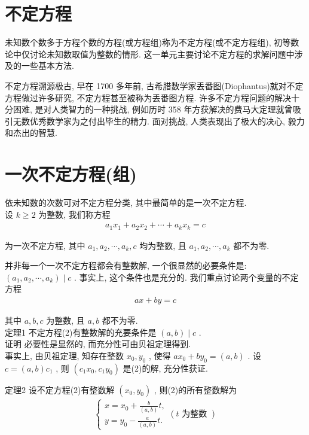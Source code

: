 	\section{不定方程}
	未知数个数多于方程个数的方程(或方程组)称为不定方程(或不定方程组), 初等数论中仅讨论未知数取值为整数的情形. 这一单元主要讨论不定方程的求解问题中涉及的一些基本方法.

	不定方程溯源极古, 早在 1700 多年前, 古希腊数学家丢番图(Diophantus)就对不定方程做过许多研究, 不定方程甚至被称为丢番图方程. 许多不定方程问题的解决十分困难, 是对人类智力的一种挑战, 例如历时 358 年方获解决的费马大定理就曾吸引无数优秀数学家为之付出毕生的精力. 面对挑战, 人类表现出了极大的决心, 毅力和杰出的智慧.

	\section{一次不定方程(组)}
	依未知数的次数可对不定方程分类, 其中最简单的是一次不定方程. \\
	设 $k \geqslant 2$ 为整数, 我们称方程
\begin{align*}
		a_{1} x_{1}+a_{2} x_{2}+\cdots+a_{k} x_{k}=c
	\end{align*}

	为一次不定方程, 其中 $a_{1} ,  a_{2} ,  \cdots ,  a_{k} ,  c$ 均为整数, 且 $a_{1} ,  a_{2} ,  \cdots ,  a_{k}$ 都不为零.

	并非每一个一次不定方程都会有整数解, 一个很显然的必要条件是:  $\left(a_{1}, a_{2}, \cdots, a_{k}\right) \mid c$ . 事实上, 这个条件也是充分的. 我们重点讨论两个变量的不定方程
\begin{align*}
		a x+b y=c
	\end{align*}

	其中 $a ,  b ,  c$ 为整数, 且 $a ,  b$ 都不为零. \\
	定理1 不定方程(2)有整数解的充要条件是 $(a, b) \mid c$ . \\
	证明 必要性是显然的, 而充分性可由贝祖定理得到. \\
	事实上, 由贝祖定理, 知存在整数 $x_{0} ,  y_{0}$ , 使得 $a x_{0}+b y_{0}=(a, b)$ . 设 $c=(a, b) c_{1}$ , 则 $\left(c_{1} x_{0}, c_{1} y_{0}\right)$ 是(2)的解, 充分性获证.

	定理2 设不定方程(2)有整数解 $\left(x_{0}, y_{0}\right)$ , 则(2)的所有整数解为
\begin{align*}
		\left\{\begin{array}{l}
			       x=x_{0}+\frac{b}{(a, b)} t, \\
			       y=y_{0}-\frac{a}{(a, b)} t .
		       \end{array}(t \text { 为整数 })\right.
	\end{align*}

